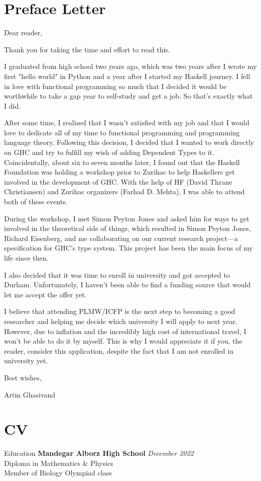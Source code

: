 \documentclass[
	a4paper,
	11pt,
]{resume}
\begin{document}
\section{Preface Letter}
Dear reader,

Thank you for taking the time and effort to read this.

I graduated from high school two years ago, which was two years after
I wrote my first "hello world" in Python and a year after I started my
Haskell journey. I fell in love with functional programming so much
that I decided it would be worthwhile to take a gap year to self-study
and get a job. So that's exactly what I did.

After some time, I realized that I wasn't satisfied with my job and
that I would love to dedicate all of my time to functional programming
and programming language theory. Following this decision, I decided
that I wanted to work directly on GHC and try to fulfill my wish of
adding Dependent Types to it. Coincidentally, about six to seven
months later, I found out that the Haskell Foundation was holding a
workshop prior to Zurihac to help Haskellers get involved in the
development of GHC. With the help of HF (David Thrane Christiansen)
and Zurihac organizers (Farhad D. Mehta), I was able to attend both of
these events.

During the workshop, I met Simon Peyton Jones and asked him for ways
to get involved in the theoretical side of things, which resulted in
Simon Peyton Jones, Richard Eisenberg, and me collaborating on our
current research project—a specification for GHC's type system. This
project has been the main focus of my life since then.

I also decided that it was time to enroll in university and got
accepted to Durham. Unfortunately, I haven't been able to find a
funding source that would let me accept the offer yet.

I believe that attending PLMW/ICFP is the next step to becoming a good
researcher and helping me decide which university I will apply to next
year. However, due to inflation and the incredibly high cost of
international travel, I won't be able to do it by myself. This is why
I would appreciate it if you, the reader, consider this application,
despite the fact that I am not enrolled in university yet.

Best wishes,

Artin Ghasivand

\newpage

\section{CV}
\begin{rSection}{Education}
	\textbf{Mandegar Alborz High School} \hfill \textit{December 2022} \\
	Diploma in Mathematics \& Physics \\
    Member of Biology Olympiad class \\
\end{rSection}
\end{document}
